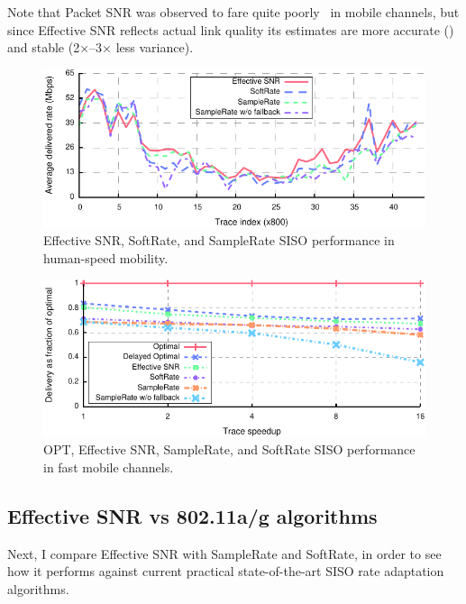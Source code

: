 Note that Packet SNR was observed to fare quite poorly~\cite{Vutukuru_SoftRate} in mobile channels, but since Effective SNR reflects actual link quality its estimates are more accurate () and stable (2$\times$--3$\times$ less variance).


\begin{figure}[t]
      \centering
      \includegraphics[width=\textwidth]{figures/rate/siso_rate_time_all.pdf}
      \caption[SISO algorithm performance in human-speed mobility]{\label{fig:siso_rate_time_opt_eff_sr_so} Effective SNR, SoftRate, and SampleRate SISO performance in human-speed mobility.}
\end{figure}
\begin{figure}[t]
      \centering
      \includegraphics[width=\textwidth]{figures/rate/siso_rate_skip_ratio.pdf}
      \caption[SISO algorithm performance in fast mobile channels]{\label{fig:siso_rate_skip_opt_eff_sr_so} OPT, Effective SNR, SampleRate, and SoftRate SISO performance in fast mobile channels.}
\end{figure}

\subsection{Effective SNR vs 802.11a/g algorithms}
Next, I compare Effective SNR with SampleRate and SoftRate, in order to see how it performs against current practical state-of-the-art SISO rate adaptation algorithms.

